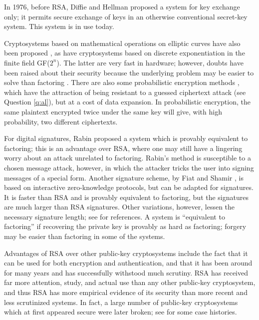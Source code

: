 In 1976, before RSA, Diffie and Hellman \cite {diffie-hellman} proposed a 
system for key exchange only; it permits secure exchange of keys in an 
otherwise conventional secret-key system. This system is in use today.

Cryptosystems based on mathematical operations on elliptic curves have also 
been proposed \cite{koblitz-ecc,miller-elliptic}, as have cryptosystems based 
on discrete exponentiation in the finite field GF($2^n$). The latter are very 
fast in hardware; however, doubts have been raised about their security 
because the underlying problem may be easier to solve than factoring \cite
{odlyzko-dlogs,gordon-mccurley}. There are also some probabilistic encryption 
methods \cite{blum-g,goldwasser}, which have the attraction of being resistant
to a guessed ciphertext attack (see Question \ref{q:al}), but at a cost of 
data expansion. In probabilistic encryption, the same plaintext encrypted 
twice under the same key will give, with high probability, two different 
ciphertexts.

For digital signatures, Rabin \cite{rabin} proposed a system which is 
provably equivalent to factoring; this is an advantage over RSA, where one 
may still have a lingering worry about an attack unrelated to factoring.
Rabin's method is susceptible to a chosen message attack, however, in which 
the attacker tricks the user into signing messages of a special form. Another 
signature scheme, by Fiat and Shamir \cite {fiat}, is based on interactive 
zero-knowledge protocols, but can be adapted for signatures. It is faster 
than RSA and is provably equivalent to factoring, but the signatures are 
much larger than RSA signatures. Other variations, however, lessen the 
necessary signature length; see \cite {burmester} for references. A
system is ``equivalent to factoring'' if recovering the private key is
provably as hard as factoring; forgery may be easier than factoring in some 
of the systems.

Advantages of RSA over other public-key cryptosystems include the fact that 
it can be used for both encryption and authentication, and that it has been 
around for many years and has successfully withstood much scrutiny. RSA has 
received far more attention, study, and actual use than any other public-key 
cryptosystem, and thus RSA has more empirical evidence of its security than 
more recent and less scrutinized systems. In fact, a large number of 
public-key cryptosystems which at first appeared secure were later broken; 
see \cite {brickell-cryptanalysis} for some case histories. 

